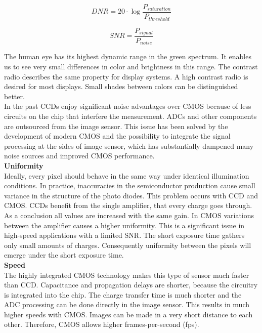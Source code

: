 \begin{equation}
DNR = 20\cdot\log{\frac{P_{saturation}}{P_{threshold}}}
\end{equation}

\begin{equation}
SNR = \frac{P_{signal}}{P_{noise}}
\end{equation}
\medskip

The human eye has its highest dynamic range in the green spectrum. It enables us to see very small differences in color and brightness in this range. The contrast radio describes the same property for display systems. A high contrast radio is desired for most displays. Small shades between colors can be distinguished better.\\  

In the past CCDs enjoy significant noise advantages over CMOS because of less circuits on the chip that interfere the measurement. ADCs and other components are outsourced from the image sensor. This issue has been solved by the development of modern CMOS and the possibility to integrate the signal processing at the sides of image sensor, which has substantially dampened many noise sources and improved CMOS performance.\\ 

\textbf{Uniformity}\\
Ideally, every pixel should behave in the same way under identical illumination conditions. In practice, inaccuracies in the semiconductor production cause small variance in the structure of the photo diodes. This problem occurs with CCD and CMOS. CCDs benefit from the single amplifier, that every charge goes through. As a conclusion all values are increased with the same gain. In CMOS variations between the amplifier causes a higher uniformity. This is a significant issue in high-speed applications with a limited SNR. The short exposure time gathers only small amounts of charges. Consequently uniformity between the pixels will emerge under the short exposure time.\\   
  
\textbf{Speed}\\
The highly integrated CMOS technology makes this type of sensor much faster than CCD. Capacitance and propagation delays are shorter, because the circuitry is integrated into the chip. The charge transfer time is much shorter and the ADC processing can be done directly in the image sensor. This results in much higher speeds with CMOS. Images can be made in a very short distance to each other. Therefore, CMOS allows higher frames-per-second (fps). \\

